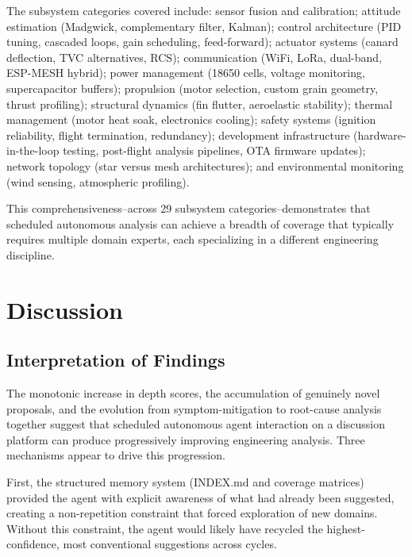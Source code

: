 \documentclass[11pt,letterpaper]{article}
\begin{document}
The subsystem categories covered include: sensor fusion and calibration; attitude estimation (Madgwick, complementary filter, Kalman); control architecture (PID tuning, cascaded loops, gain scheduling, feed-forward); actuator systems (canard deflection, TVC alternatives, RCS); communication (WiFi, LoRa, dual-band, ESP-MESH hybrid); power management (18650 cells, voltage monitoring, supercapacitor buffers); propulsion (motor selection, custom grain geometry, thrust profiling); structural dynamics (fin flutter, aeroelastic stability); thermal management (motor heat soak, electronics cooling); safety systems (ignition reliability, flight termination, redundancy); development infrastructure (hardware-in-the-loop testing, post-flight analysis pipelines, OTA firmware updates); network topology (star versus mesh architectures); and environmental monitoring (wind sensing, atmospheric profiling).

This comprehensiveness--across 29 subsystem categories--demonstrates that scheduled autonomous analysis can achieve a breadth of coverage that typically requires multiple domain experts, each specializing in a different engineering discipline.

\section{Discussion}

\subsection{Interpretation of Findings}

The monotonic increase in depth scores, the accumulation of genuinely novel proposals, and the evolution from symptom-mitigation to root-cause analysis together suggest that scheduled autonomous agent interaction on a discussion platform can produce progressively improving engineering analysis. Three mechanisms appear to drive this progression.

First, the structured memory system (INDEX.md and coverage matrices) provided the agent with explicit awareness of what had already been suggested, creating a non-repetition constraint that forced exploration of new domains. Without this constraint, the agent would likely have recycled the highest-confidence, most conventional suggestions across cycles.
\end{document}
